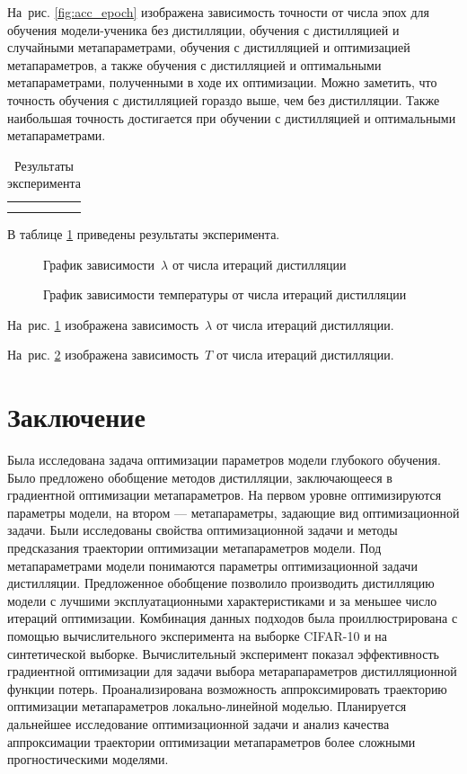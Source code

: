 \documentclass[12pt, twoside]{article}
\begin{document}
На~рис. \ref{fig:acc_epoch} изображена зависимость точности от числа эпох для обучения модели-ученика без дистилляции, обучения с дистилляцией и случайными метапараметрами, обучения с дистилляцией и оптимизацией метапараметров, а также обучения с дистилляцией и оптимальными метапараметрами, полученными в ходе их оптимизации. Можно заметить, что точность обучения с дистилляцией гораздо выше, чем без дистилляции. Также наибольшая точность достигается при обучении с дистилляцией и оптимальными метапараметрами.

\begin{table}[h]
\centering
\begin{tabular}{c|c}
&  \\
&
\end{tabular}
\caption{Результаты эксперимента}
\label{tab:experiment_results}
\end{table}

В таблице \ref{tab:experiment_results} приведены результаты эксперимента.

\begin{figure}[h]
\centering
\caption{График зависимости~$\lambda$ от числа итераций дистилляции}
\label{fig:iter_beta}
\end{figure}

\begin{figure}[h]
\centering
\caption{График зависимости температуры от числа итераций дистилляции}
\label{fig:iter_temp}
\end{figure}

На~рис. \ref{fig:iter_beta} изображена зависимость~$\lambda$ от числа итераций дистилляции.

На~рис. \ref{fig:iter_temp} изображена зависимость~$T$ от числа итераций дистилляции.

\section{Заключение}

Была исследована задача оптимизации параметров модели глубокого обучения. Было предложено обобщение методов дистилляции, заключающееся в градиентной оптимизации метапараметров. На первом уровне оптимизируются параметры модели, на втором --- метапараметры, задающие вид оптимизационной задачи. Были исследованы свойства оптимизационной задачи и методы предсказания траектории оптимизации метапараметров модели. Под метапараметрами модели понимаются параметры оптимизационной задачи дистилляции. Предложенное обобщение позволило производить дистилляцию модели с лучшими эксплуатационными характеристиками и за меньшее число итераций оптимизации. Комбинация данных подходов была проиллюстрирована с помощью вычислительного эксперимента на выборке CIFAR-10 и на синтетической выборке. Вычислительный эксперимент показал эффективность градиентной оптимизации для задачи выбора метарапараметров дистилляционной функции потерь. Проанализирована возможность аппроксимировать траекторию оптимизации метапараметров локально-линейной моделью. Планируется дальнейшее исследование оптимизационной задачи и анализ качества аппроксимации траектории оптимизации метапараметров более сложными прогностическими моделями.
\end{document}
